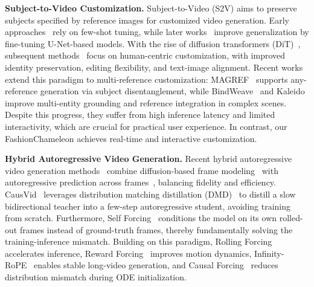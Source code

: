 \documentclass{llmxive}
\providecommand{\method}{FashionChameleon\xspace}
\begin{document}
\noindent
\textbf{Subject-to-Video Customization.}
%
Subject-to-Video (S2V) aims to preserve subjects specified by reference images for customized video generation.
% 
Early approaches~\cite{wang2026customvideo,chen2024disenstudio} rely on few-shot tuning, while later works~\cite{he2024id,yuan2025identity} improve generalization by fine-tuning U-Net-based models.
% 
With the rise of diffusion transformers (DiT)~\cite{peebles2023scalable,bao2023all}, subsequent methods~\cite{vace,fei2025skyreels,xue2025stand,liu2025phantom} focus on human-centric customization, with improved identity preservation, editing flexibility, and text-image alignment.
% 
Recent works extend this paradigm to multi-reference customization:
MAGREF~\cite{deng2025magref} supports any-reference generation via subject disentanglement, while BindWeave~\cite{li2025bindweave} and Kaleido~\cite{zhang2025kaleido} improve multi-entity grounding and reference integration in complex scenes.
% 
Despite this progress, they suffer from high inference latency and limited interactivity, which are crucial for practical user experience.
% 
In contrast, our \method achieves real-time and interactive customization.





\noindent
\textbf{Hybrid Autoregressive Video Generation.}
%
Recent hybrid autoregressive video generation methods~\cite{chen2024diffusion,yin2025slow,huang2025self,zhu2026causal} combine diffusion-based frame modeling~\cite{kong2024hunyuanvideo,yang2024cogvideox,wan2025wan} with autoregressive prediction across frames~\cite{kondratyuk2023videopoet,sun2024autoregressive}, balancing fidelity and efficiency.
% 
CausVid~\cite{yin2025slow} leverages distribution matching distillation (DMD)~\cite{yin2024improved} to distill a slow bidirectional teacher into a few-step autoregressive student, avoiding training from scratch.
% 
Furthermore, Self Forcing~\cite{huang2025self} conditions the model on its own rolled-out frames instead of ground-truth frames, thereby fundamentally solving the training-inference mismatch.
% 
Building on this paradigm, Rolling Forcing~\cite{liu2025rolling} accelerates inference, Reward Forcing~\cite{lu2025reward} improves motion dynamics, Infinity-RoPE~\cite{yesiltepe2025infinity} enables stable long-video generation, and Causal Forcing~\cite{zhu2026causal} reduces distribution mismatch during ODE initialization.
\end{document}

